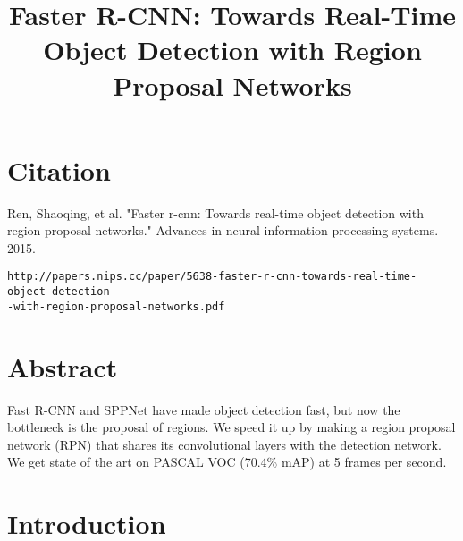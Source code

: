 \documentclass[a4paper]{article}
\title{Faster R-CNN: Towards Real-Time Object Detection with Region Proposal
Networks}
\date{}
\begin{document}
\maketitle

\section{Citation}
Ren, Shaoqing, et al. "Faster r-cnn: Towards real-time object detection with region proposal networks." Advances in neural information processing systems. 2015.

\begin{verbatim}
http://papers.nips.cc/paper/5638-faster-r-cnn-towards-real-time-object-detection
-with-region-proposal-networks.pdf
\end{verbatim}

\section{Abstract}
Fast R-CNN and SPPNet have made object detection fast, but now the bottleneck is
the proposal of regions. We speed it up by making a region proposal network
(RPN) that shares its convolutional layers with the detection network. We
get state of the art on PASCAL VOC (70.4\% mAP) at 5 frames per second.

\section{Introduction}
\end{document}
